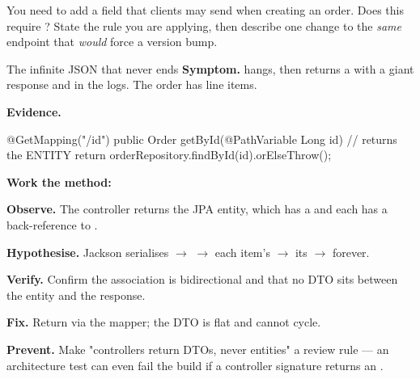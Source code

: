 \begin{thinkbox}
You need to add a  field that clients may send when creating an order. Does this require ? State the rule you are applying, then describe one change to the \emph{same} endpoint that \emph{would} force a version bump.
\end{thinkbox}


\begin{debuglab}{The infinite JSON that never ends}
\textbf{Symptom.}  hangs, then returns a  with a giant response and  in the logs. The order has line items.

\smallskip\textbf{Evidence.}
\begin{javabox}
@GetMapping("/{id}")
public Order getById(@PathVariable Long id) {   // returns the ENTITY
  return orderRepository.findById(id).orElseThrow();
}
\end{javabox}

\textbf{Work the method:}
\begin{tickcheck}
  \item \textbf{Observe.} The controller returns the JPA  entity, which has a  and each  has a back-reference to .
  \item \textbf{Hypothesise.} Jackson serialises  $\rightarrow$  $\rightarrow$ each item's  $\rightarrow$ its  $\rightarrow$ forever.
  \item \textbf{Verify.} Confirm the association is bidirectional and that no DTO sits between the entity and the response.
  \item \textbf{Fix.} Return  via the mapper; the DTO is flat and cannot cycle.
  \item \textbf{Prevent.} Make "controllers return DTOs, never entities" a review rule --- an architecture test can even fail the build if a controller signature returns an .
\end{tickcheck}
\end{debuglab}

